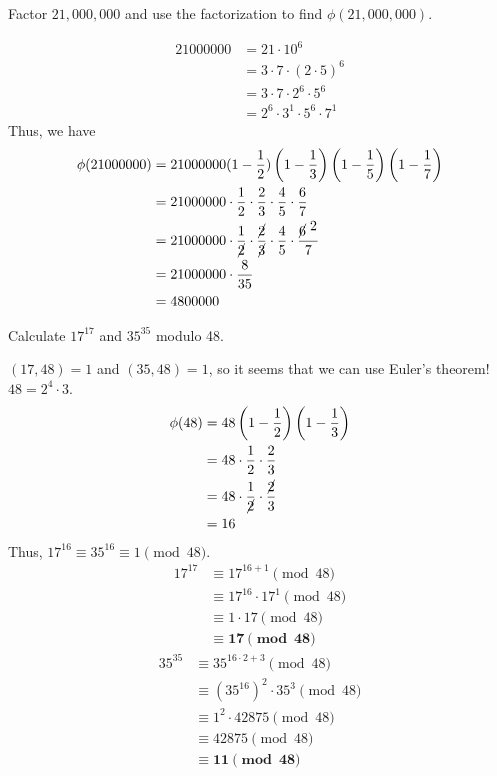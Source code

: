 \documentclass{article}
\begin{document}
\begin{problem}{}{}
    Factor $21,000,000$ and use the factorization to find $\phi(21,000,000)$.
\end{problem}
\begin{solution}{}{}
    \begin{align*}
        21000000 &= 21 \cdot 10^6 \\
        &= 3 \cdot 7 \cdot (2 \cdot 5)^6 \\
        &= 3 \cdot 7 \cdot 2^6 \cdot 5^6 \\
        &= 2^6 \cdot 3^1 \cdot 5^6 \cdot 7^1
    \end{align*}
    Thus, we have
    \begin{align*}
        \phi(21000000) &= 21000000 (1 - \frac{1}{2})\left(1 - \frac{1}{3}\right)\left(1 - \frac{1}{5}\right)\left(1 - \frac{1}{7}\right) \\
        &= 21000000 \cdot \frac{1}{2} \cdot \frac{2}{3} \cdot \frac{4}{5} \cdot \frac{6}{7} \\
        &= 21000000 \cdot \frac{1}{\cancel{2}} \cdot \frac{\cancel{2}}{\cancel{3}} \cdot \frac{4}{5} \cdot \frac{\cancel{6}^{\displaystyle{\hspace{0.1cm}2}}}{7} \\
        &= 21000000 \cdot \frac{8}{35}\\
        &= 4800000
    \end{align*}
\end{solution}

\begin{problem}{}{}
    Calculate $17^{17}$ and $35^{35}$ modulo 48.
\end{problem}
\begin{solution}{}{}
    $(17, 48) = 1$ and $(35, 48) = 1$, so it seems that we can use Euler's theorem! $48 = 2^4 \cdot 3$.
    \begin{align*}
        \phi(48) &= 48 \left(1 - \frac{1}{2}\right)\left(1 - \frac{1}{3}\right) \\
        &= 48 \cdot \frac{1}{2} \cdot \frac{2}{3} \\
        &= 48 \cdot \frac{1}{\cancel{2}} \cdot \frac{\cancel{2}}{3} \\
        &=16
    \end{align*}
    Thus, $17^{16}\equiv35^{16}\equiv1\pmod{48}$.
    \begin{align*}
        17^{17}&\equiv17^{16+1}\pmod{48} \\
        &\equiv17^{16}\cdot17^1\pmod{48} \\
        &\equiv1\cdot17\pmod{48} \\
        &\equiv\mathbf{17\pmod{48}}
    \end{align*}
    \begin{align*}
        35^{35}&\equiv35^{16\cdot2+3}\pmod{48} \\
        &\equiv(35^{16})^2\cdot35^3\pmod{48} \\
        &\equiv1^2\cdot42875\pmod{48} \\
        &\equiv42875\pmod{48} \\
        &\equiv\mathbf{11\pmod{48}}
    \end{align*}
\end{solution}
\end{document}

